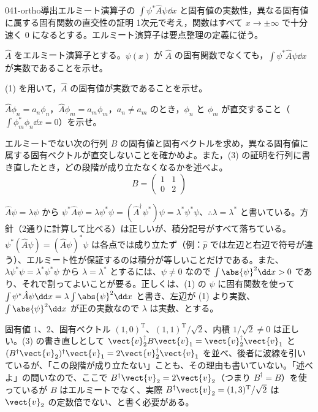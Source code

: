 \documentclass[uplatex,dvipdfmx,a4paper,11pt]{jsarticle}
\begin{document}
\mondaihen
{}
\begin{mondai}{041-ortho}{導出}{エルミート演算子の $\int\psi^{*}\hat{A}\psi\dd x$ と固有値の実数性，異なる固有値に属する固有関数の直交性の証明}
1次元で考え，関数はすべて $x\to\pm\infty$ で十分速く 0 になるとする。エルミート演算子は要点整理の定義に従う。
  \begin{shoumon}
    \item $\hat{A}$ をエルミート演算子とする。$\psi(x)$ が $\hat{A}$ の固有関数でなくても，$\int\psi^{*}\hat{A}\psi\dd x$ が実数であることを示せ。
    \item (1) を用いて，$\hat{A}$ の固有値が実数であることを示せ。
    \item $\hat{A}\phi_{n}=a_{n}\phi_{n}$，$\hat{A}\phi_{m}=a_{m}\phi_{m}$，$a_{n}\neq a_{m}$ のとき，$\phi_{n}$ と $\phi_{m}$ が直交すること（$\int\phi_{m}^{*}\phi_{n}\dd x=0$）を示せ。
    \item エルミートでない次の行列 $B$ の固有値と固有ベクトルを求め，異なる固有値に属する固有ベクトルが直交しないことを確かめよ。また，(3) の証明を行列に書き直したとき，どの段階が成り立たなくなるかを述べよ。
      \[
        B=\begin{pmatrix}1&1\\0&2\end{pmatrix}
      \]
  \end{shoumon}

\begin{kotaeran}
   $\hat{A}\psi=\lambda\psi$ から $\psi^{*}\hat{A}\psi=\lambda\psi^{*}\psi=(\hat{A}^{\dagger}\psi^{*})\psi=\lambda^{*}\psi^{*}\psi$、$\therefore\lambda=\lambda^{*}$ と書いている。方針（2通りに計算して比べる）は正しいが、積分記号がすべて落ちている。$\psi^{*}(\hat{A}\psi)=(\hat{A}\psi)^{*}\psi$ は各点では成り立たず（例：$\hat{p}$ では左辺と右辺で符号が違う）、エルミート性が保証するのは積分が等しいことだけである。また、$\lambda\psi^{*}\psi=\lambda^{*}\psi^{*}\psi$ から $\lambda=\lambda^{*}$ とするには、$\psi\neq0$ なので $\int\abs{\psi}^{2}\dd x>0$ であり、それで割ってよいことが要る。正しくは、(1) の $\psi$ に固有関数を使って $\int\psi^{*}\hat{A}\psi\dd x=\lambda\int\abs{\psi}^{2}\dd x$ と書き、左辺が (1) より実数、$\int\abs{\psi}^{2}\dd x$ が正の実数なので $\lambda$ は実数、とする。

   固有値 $1$、$2$、固有ベクトル $(1,0)^{\mathrm{T}}$、$(1,1)^{\mathrm{T}}/\sqrt{2}$、内積 $1/\sqrt{2}\neq0$ は正しい。(3) の書き直しとして $\vect{v}_{2}^{\dagger}B\vect{v}_{1}=\vect{v}_{2}^{\dagger}\vect{v}_{1}$ と $(B^{\dagger}\vect{v}_{2})^{\dagger}\vect{v}_{1}=2\vect{v}_{2}^{\dagger}\vect{v}_{1}$ を並べ、後者に波線を引いているが、「この段階が成り立たない」ことも、その理由も書いていない。「述べよ」の問いなので、ここで $B^{\dagger}\vect{v}_{2}=2\vect{v}_{2}$（つまり $B^{\dagger}=B$）を使っているが $B$ はエルミートでなく、実際 $B^{\dagger}\vect{v}_{2}=(1,3)^{\mathrm{T}}/\sqrt{2}$ は $\vect{v}_{2}$ の定数倍でない、と書く必要がある。


\end{kotaeran}
\end{mondai}
\end{document}
